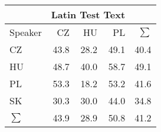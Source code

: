 \begin{tabular}{l|rrr|r}
\hline
 & \multicolumn{3}{c}{Latin Test Text} & \\
\hline
 Speaker   &   CZ &   HU &   PL &   $\sum$ \\
\hline
 CZ        & 43.8 & 28.2 & 49.1 &     40.4 \\
 HU        & 48.7 & 40.0 & 58.7 &     49.1 \\
 PL        & 53.3 & 18.2 & 53.2 &     41.6 \\
 SK        & 30.3 & 30.0 & 44.0 &     34.8 \\
\hline
 $\sum$   & 43.9 & 28.9 & 50.8 &     41.2 \\
\hline
\end{tabular}